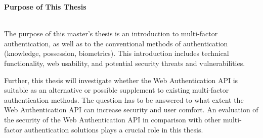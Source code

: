 \thispagestyle{empty}

{}

\begin{large}
	\textbf{Purpose of This Thesis} \\ \\
\end{large}

The purpose of this master's thesis is an introduction to multi-factor authentication, as well as to the conventional methods of authentication (knowledge, possession, biometrics). This introduction includes technical functionality, web usability, and potential security threats and vulnerabilities.

Further, this thesis will investigate whether the Web Authentication API is suitable as an alternative or possible supplement to existing multi-factor authentication methods. The question has to be answered to what extent the Web Authentication API can increase security and user comfort. An evaluation of the security of the Web Authentication API in comparison with other multi-factor authentication solutions plays a crucial role in this thesis.

\newpage